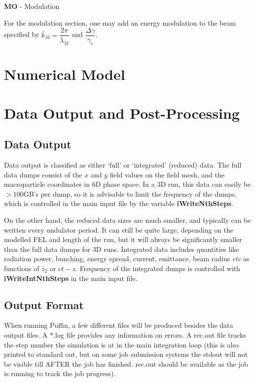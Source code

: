 \documentclass[12pt]{article}%
\begin{document}
{\bf MO} - Modulation

For the modulation section, one may add an energy modulation to the beam specified by $\bar{k}_M = \dfrac{2 \pi}{\bar{\lambda}_M}$ and $\dfrac{\Delta \gamma}{\gamma_r}$.


\newpage

\section{Numerical Model}

\newpage

\section{Data Output and Post-Processing}

\subsection{Data Output}

Data output is classified as either `full' or `integrated' (reduced) data. The full data dumps consist of the $x$ and $y$ field values on the field mesh, and the macroparticle coordinates in 6D phase space. In a 3D run, this data can easily be $>100$GB's per dump, so it is advisable to limit the frequency of the dumps, which is controlled in the main input file by the variable {\bf iWriteNthSteps}.

On the other hand, the reduced data sizes are much smaller, and typically can be written every undulator period. It can still be quite large, depending on the modelled FEL and length of the run, but it will always be significantly smaller than the full data dumps for 3D runs. Integrated data includes quantities like radiation power, bunching, energy spread, current, emittance, beam radius \textit{etc} as functions of $\bar{z}_2$ or $ct-z$. Frequency of the integrated dumps is controlled with {\bf iWriteIntNthSteps} in the main input file.

\subsection{Output Format}

When running Puffin, a few different files will be produced besides the data output files. A *.log file provides any information on errors. A rec.out file tracks the step number the simulation is at in the main integration loop (this is also printed to standard out, but on some job submission systems the stdout will not be visible till AFTER the job has finished. rec.out should be available as the job is running to track the job progress).
\end{document}
